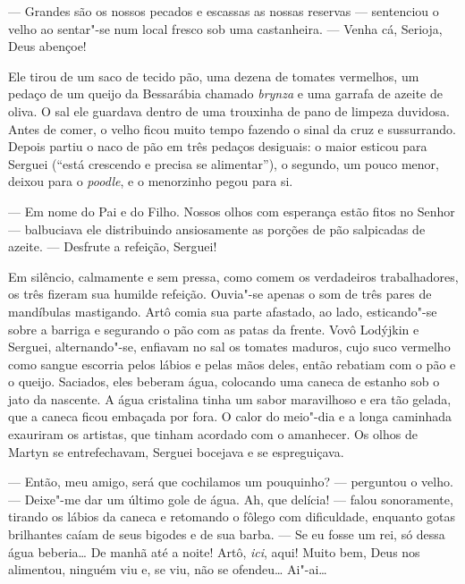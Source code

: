 --- Grandes são os nossos pecados e escassas as nossas reservas ---
sentenciou o velho ao sentar"-se num local fresco sob uma castanheira.
--- Venha cá, Serioja, Deus abençoe!

Ele tirou de um saco de tecido pão, uma dezena de tomates vermelhos, um
pedaço de um queijo da Bessarábia chamado \emph{brynza} e uma garrafa de
azeite de oliva. O sal ele guardava dentro de uma trouxinha de pano de
limpeza duvidosa. Antes de comer, o velho ficou muito tempo fazendo o
sinal da cruz e sussurrando. Depois partiu o naco de pão em três pedaços
desiguais: o maior esticou para Serguei (``está crescendo e precisa se
alimentar''), o segundo, um pouco menor, deixou para o \emph{poodle}, e o
menorzinho pegou para si.

--- Em nome do Pai e do Filho. Nossos olhos com esperança estão fitos no
Senhor --- balbuciava ele distribuindo ansiosamente as porções de pão
salpicadas de azeite. --- Desfrute a refeição, Serguei!

Em silêncio, calmamente e sem pressa, como comem os verdadeiros
trabalhadores, os três fizeram sua humilde refeição. Ouvia"-se apenas o
som de três pares de mandíbulas mastigando. Artô comia sua parte
afastado, ao lado, esticando"-se sobre a barriga e segurando o pão com as
patas da frente. Vovô Lodýjkin e Serguei, alternando"-se, enfiavam no sal
os tomates maduros, cujo suco vermelho como sangue escorria pelos lábios
e pelas mãos deles, então rebatiam com o pão e o queijo. Saciados, eles
beberam água, colocando uma caneca de estanho sob o jato da nascente. A
água cristalina tinha um sabor maravilhoso e era tão gelada, que a
caneca ficou embaçada por fora. O calor do meio"-dia e a longa caminhada
exauriram os artistas, que tinham acordado com o amanhecer. Os olhos de
Martyn se entrefechavam, Serguei bocejava e se espreguiçava.

--- Então, meu amigo, será que cochilamos um pouquinho? --- perguntou o
velho. --- Deixe"-me dar um último gole de água. Ah, que delícia! ---
falou sonoramente, tirando os lábios da caneca e retomando o fôlego com
dificuldade, enquanto gotas brilhantes caíam de seus bigodes e de sua
barba. --- Se eu fosse um rei, só dessa água beberia\ldots{} De manhã até a
noite! Artô, \emph{ici}, aqui! Muito bem, Deus nos alimentou, ninguém
viu e, se viu, não se ofendeu\ldots{} Ai"-ai\ldots{}

